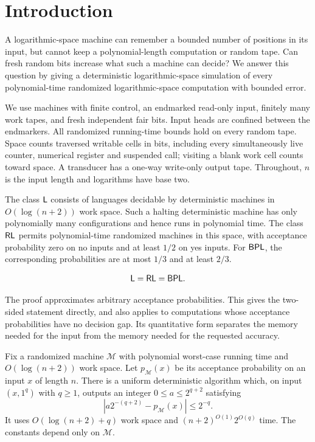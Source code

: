 \section{Introduction}\label{sec:intro}

A logarithmic-space machine can remember a bounded number of positions
in its input, but cannot keep a polynomial-length computation or random
tape. Can fresh random bits increase what such a machine can decide?
We answer this question by giving a deterministic logarithmic-space
simulation of every polynomial-time randomized logarithmic-space
computation with bounded error.

We use machines with finite control, an endmarked read-only input,
finitely many work tapes, and fresh independent fair bits. Input heads
are confined between the endmarkers. All randomized running-time
bounds hold on every random tape. Space counts traversed writable cells
in bits, including every simultaneously live counter, numerical register
and suspended call; visiting a blank work cell counts toward space.
A transducer has a one-way write-only output tape. Throughout,
$n$ is the input length and logarithms have base two.

The class $\mathsf L$ consists of languages decidable by deterministic
machines in $O(\log(n+2))$ work space. Such a halting deterministic
machine has only polynomially many configurations and hence runs in
polynomial time. The class $\mathsf{RL}$ permits
polynomial-time randomized machines in this space, with acceptance
probability zero on no inputs and at least $1/2$ on yes inputs.
For $\mathsf{BPL}$, the corresponding probabilities are at most $1/3$ and at
least $2/3$.

\begin{theorem}\label{thm:main}
\[
                 \mathsf L=\mathsf{RL}=\mathsf{BPL}.
\]
\end{theorem}

The proof approximates arbitrary acceptance probabilities. This gives
the two-sided statement directly, and also applies to computations
whose acceptance probabilities have no decision gap. Its quantitative
form separates the memory needed for the input from the memory needed
for the requested accuracy.

\begin{theorem}\label{thm:probability}
Fix a randomized machine $\mathcal M$ with polynomial worst-case
running time and $O(\log(n+2))$ work space. Let $p_{\mathcal M}(x)$ be
its acceptance probability on an input $x$ of length $n$. There is a
uniform deterministic algorithm which, on input $(x,1^q)$ with $q\ge1$,
outputs an integer $0\le a\le2^{q+2}$ satisfying
\[
       \left|a2^{-(q+2)}-p_{\mathcal M}(x)\right|\le2^{-q}.
\]
It uses $O(\log(n+2)+q)$ work space and
$(n+2)^{O(1)}2^{O(q)}$ time. The constants depend only on $\mathcal M$.
\end{theorem}

